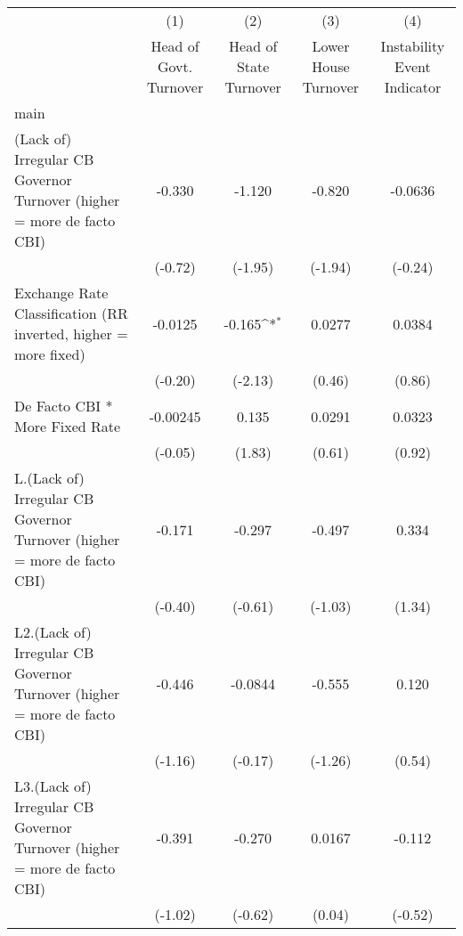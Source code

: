 {
\def\sym#1{\ifmmode^{#1}\else\(^{#1}\)\fi}
\begin{longtable}{l*{4}{c}}
\hline\hline\endfirsthead\hline\endhead\hline\endfoot\endlastfoot
                &\multicolumn{1}{c}{(1)}&\multicolumn{1}{c}{(2)}&\multicolumn{1}{c}{(3)}&\multicolumn{1}{c}{(4)}\\
                &\multicolumn{1}{c}{Head of Govt. Turnover}&\multicolumn{1}{c}{Head of State Turnover}&\multicolumn{1}{c}{Lower House Turnover}&\multicolumn{1}{c}{Instability Event Indicator}\\
\hline
main            &                  &                  &                  &                  \\
(Lack of) Irregular CB Governor Turnover (higher = more de facto CBI)&   -0.330         &   -1.120         &   -0.820         &  -0.0636         \\
                &  (-0.72)         &  (-1.95)         &  (-1.94)         &  (-0.24)         \\
[1em]
Exchange Rate Classification (RR inverted, higher = more fixed)&  -0.0125         &   -0.165\sym{*}  &   0.0277         &   0.0384         \\
                &  (-0.20)         &  (-2.13)         &   (0.46)         &   (0.86)         \\
[1em]
De Facto CBI * More Fixed Rate& -0.00245         &    0.135         &   0.0291         &   0.0323         \\
                &  (-0.05)         &   (1.83)         &   (0.61)         &   (0.92)         \\
[1em]
L.(Lack of) Irregular CB Governor Turnover (higher = more de facto CBI)&   -0.171         &   -0.297         &   -0.497         &    0.334         \\
                &  (-0.40)         &  (-0.61)         &  (-1.03)         &   (1.34)         \\
[1em]
L2.(Lack of) Irregular CB Governor Turnover (higher = more de facto CBI)&   -0.446         &  -0.0844         &   -0.555         &    0.120         \\
                &  (-1.16)         &  (-0.17)         &  (-1.26)         &   (0.54)         \\
[1em]
L3.(Lack of) Irregular CB Governor Turnover (higher = more de facto CBI)&   -0.391         &   -0.270         &   0.0167         &   -0.112         \\
                &  (-1.02)         &  (-0.62)         &   (0.04)         &  (-0.52)         \\

\end{longtable}}
